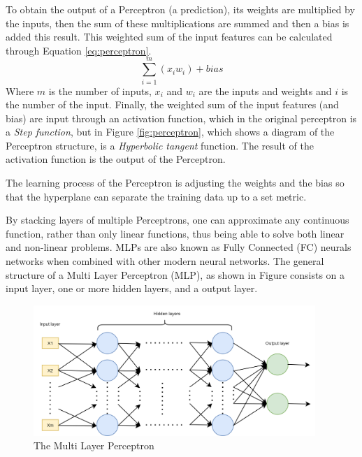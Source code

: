 To obtain the output of a Perceptron (a prediction), its weights are multiplied by the inputs, then the sum of these multiplications are summed and then a bias is added this result. This weighted sum of the input features can be calculated through Equation \ref{eq:perceptron}. 
\begin{equation}\label{eq:perceptron}
\displaystyle\sum_{i=1} ^{m} (x_i w_i)+bias
\end{equation}
Where $m$ is the number of inputs, $x_i$ and $w_i$ are the inputs and weights and $i$ is the number of the input. Finally, the weighted sum of the input features (and bias) are input through an activation function, which in the original perceptron is a \textit{Step function}, but in Figure \ref{fig:perceptron}, which shows a diagram of the Perceptron structure, is a \textit{Hyperbolic tangent} function. The result of the activation function is the output of the Perceptron.

The learning process of the Perceptron is adjusting the weights and the bias so that the hyperplane can separate the training data up to a set metric.

By stacking layers of multiple Perceptrons, one can approximate any continuous function, rather than only linear functions, thus being able to solve both linear and non-linear problems. MLPs are also known as Fully Connected (FC) neurals networks when combined with other modern neural networks.
The general structure of a Multi Layer Perceptron (MLP), as shown in Figure \cite{fig:mlp-structure} consists on a input layer, one or more hidden layers, and a output layer.

\begin{figure}[!ht]
    \centering
    \includegraphics[width=0.95\textwidth]{img/MLP.drawio.png}
    \caption{The Multi Layer Perceptron}
    \label{fig:mlp-structure}
\end{figure}

